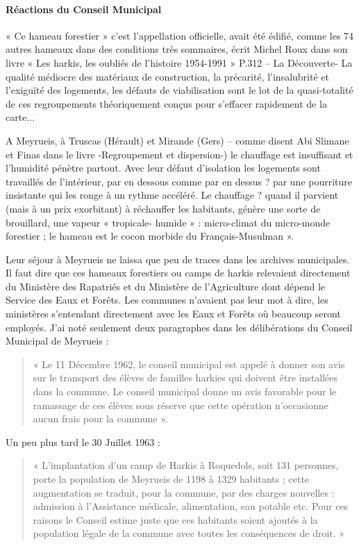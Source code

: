 \paragraph{Réactions du Conseil Municipal}

« Ce hameau forestier » c’est l’appellation officielle, avait été édifié, comme les 74
autres hameaux dans des conditions très sommaires, écrit Michel Roux dans son livre
« Les harkis, les oubliés de l’histoire 1954-1991 » P.312 – La Découverte- La qualité médiocre
des matériaux de construction, la précarité, l’insalubrité et l’exiguïté des logements,
les défauts de viabilisation sont le lot de la quasi-totalité de ces regroupements
théoriquement conçus pour s’effacer rapidement de la carte...

A Meyrueis, à Truscas (Hérault) et Mirande (Gers) – comme disent Abi Slimane et Finas
dans le livre -Regroupement et dispersion-) le chauffage est insuffisant et l’humidité pénètre
partout. Avec leur défaut d’isolation les logements sont travaillés de l’intérieur, par
en dessous comme par en dessus ? par une pourriture insistante qui les ronge à un
rythme accéléré. Le chauffage ? quand il parvient (mais à un prix exorbitant) à
réchauffer les habitants, génère une sorte de brouillard, une vapeur « tropicale-
humide » : micro-climat du micro-monde forestier ; le hameau est le cocon morbide
du Français-Musulman ».

Leur séjour à Meyrueis ne laissa que peu de traces dans les archives municipales. Il
faut dire que ces hameaux forestiers ou camps de harkis relevaient directement du
Ministère des Rapatriés et du Ministère de l’Agriculture dont dépend le Service des
Eaux et Forêts. Les communes n’avaient pas leur mot à dire, les ministères
s’entendant directement avec les Eaux et Forêts où beaucoup seront employés. J’ai
noté seulement deux paragraphes dans les délibérations du Conseil Municipal de
Meyrueis :

\begin{quote}
« Le 11 Décembre 1962, le conseil municipal est appelé à donner son avis sur le
transport des élèves de familles harkies qui doivent être installées dans la commune.
Le conseil municipal donne un avis favorable pour le ramassage de ces élèves sous
réserve que cette opération n’occasionne aucun frais pour la commune ».
\end{quote}

Un peu plus tard le 30 Juillet 1963 :

\begin{quote}
« L’implantation d’un camp de Harkis à Roquedols, soit 131 personnes, porte la
population de Meyrueis de 1198 à 1329 habitants ; cette augmentation se traduit,
pour la commune, par des charges nouvelles : admission à l’Assistance médicale,
alimentation, eau potable etc. Pour ces raisons le Conseil estime juste que ces
habitants soient ajoutés à la population légale de la commune avec toutes les
conséquences de droit. »
\end{quote}

